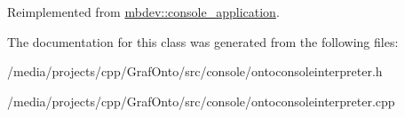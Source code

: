 \-Reimplemented from \hyperlink{classmbdev_1_1console__application}{mbdev\-::console\-\_\-application}.



\-The documentation for this class was generated from the following files\-:\begin{DoxyCompactItemize}
\item 
/media/projects/cpp/\-Graf\-Onto/src/console/ontoconsoleinterpreter.\-h\item 
/media/projects/cpp/\-Graf\-Onto/src/console/ontoconsoleinterpreter.\-cpp\end{DoxyCompactItemize}
